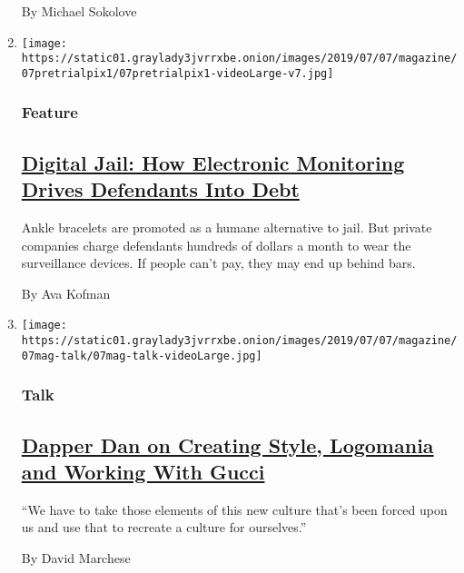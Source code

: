 \begin{enumerate}
  By Michael Sokolove
\item
  \texttt{[image: https://static01.graylady3jvrrxbe.onion/images/2019/07/07/magazine/07pretrialpix1/07pretrialpix1-videoLarge-v7.jpg]}

  \hypertarget{feature-2}{%
  \subsubsection{Feature}\label{feature-2}}

  \hypertarget{digital-jail-how-electronic-monitoring-drives-defendants-into-debt}{%
  \subsection{\texorpdfstring{\href{/2019/07/03/magazine/digital-jail-surveillance.html}{Digital
  Jail: How Electronic Monitoring Drives Defendants Into
  Debt}}{Digital Jail: How Electronic Monitoring Drives Defendants Into Debt}}\label{digital-jail-how-electronic-monitoring-drives-defendants-into-debt}}

  Ankle bracelets are promoted as a humane alternative to jail. But
  private companies charge defendants hundreds of dollars a month to
  wear the surveillance devices. If people can't pay, they may end up
  behind bars.

  By Ava Kofman
\item
  \texttt{[image: https://static01.graylady3jvrrxbe.onion/images/2019/07/07/magazine/07mag-talk/07mag-talk-videoLarge.jpg]}

  \hypertarget{talk}{%
  \subsubsection{Talk}\label{talk}}

  \hypertarget{dapper-dan-on-creating-style-logomania-and-working-with-gucci}{%
  \subsection{\texorpdfstring{\href{/interactive/2019/07/01/magazine/dapper-dan-hip-hop-style.html}{Dapper
  Dan on Creating Style, Logomania and Working With
  Gucci}}{Dapper Dan on Creating Style, Logomania and Working With Gucci}}\label{dapper-dan-on-creating-style-logomania-and-working-with-gucci}}

  ``We have to take those elements of this new culture that's been
  forced upon us and use that to recreate a culture for ourselves.''

  By David Marchese
\end{enumerate}

